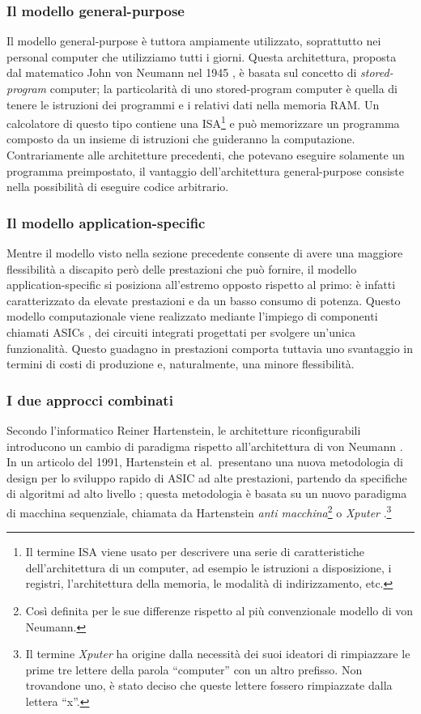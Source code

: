 \subsubsection{Il modello general-purpose}
Il modello general-purpose è tuttora ampiamente utilizzato, soprattutto nei personal
computer che utilizziamo tutti i giorni. Questa architettura, proposta dal matematico
John von Neumann nel 1945 \cite{First-Draft-Report-EDVAC}, è basata sul concetto di
\emph{stored-program} computer; la particolarità di uno stored-program computer è quella
di tenere le istruzioni dei programmi e i relativi dati nella memoria RAM. Un calcolatore di
questo tipo contiene una \ac{ISA}\footnote{Il termine \acl{ISA} viene usato per descrivere
una serie di caratteristiche dell'architettura di un computer, ad esempio le istruzioni
a disposizione, i registri, l'architettura della memoria, le modalità di indirizzamento, etc.}
e può memorizzare un programma composto da un insieme di istruzioni che guideranno
la computazione. Contrariamente alle architetture precedenti, che potevano eseguire
solamente un programma preimpostato, il vantaggio dell'architettura general-purpose consiste
nella possibilità di eseguire codice arbitrario.

\subsubsection{Il modello application-specific}
Mentre il modello visto nella sezione precedente consente di avere una maggiore
flessibilità a discapito però delle prestazioni che può fornire, il modello
application-specific si posiziona all'estremo opposto rispetto al primo: è infatti
caratterizzato da elevate prestazioni e da un basso consumo di potenza. Questo modello
computazionale viene realizzato mediante l'impiego di componenti chiamati \acp{ASIC}
\cite{ASICMicroprocessors},
dei circuiti integrati progettati per svolgere un'unica funzionalità. Questo guadagno
in prestazioni comporta tuttavia uno svantaggio in termini di costi di produzione e,
naturalmente, una minore flessibilità.


\subsubsection{I due approcci combinati}
Secondo l'informatico Reiner Hartenstein, le architetture riconfigurabili introducono un
cambio di paradigma rispetto all'architettura di von Neumann
\cite{HartensteinParadigmShift}. In un articolo del 1991, Hartenstein et al.~presentano
una nuova metodologia di design per lo sviluppo rapido di \ac{ASIC} ad alte prestazioni,
partendo da specifiche di algoritmi ad alto livello \cite{HartensteinNovelASICDesign};
questa metodologia è basata su un nuovo paradigma di macchina sequenziale, chiamata da
Hartenstein \emph{anti macchina}\footnote{Così definita per le sue differenze rispetto al
più convenzionale modello di von Neumann.} o \emph{Xputer} \cite{HartensteinNovelASICDesign}.\footnote{Il termine
\emph{Xputer} ha origine dalla necessità dei suoi ideatori di rimpiazzare le prime tre
lettere della parola ``computer'' con un altro prefisso. Non trovandone uno, è stato
deciso che queste lettere fossero rimpiazzate dalla lettera ``x''.}

